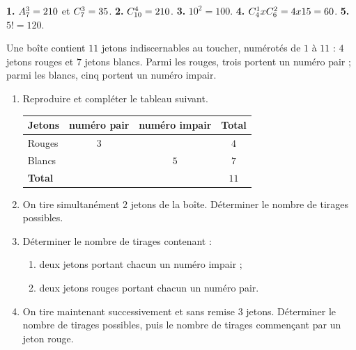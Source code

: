 \begin{corrige}[je me teste]
\textbf{1.} $\arrang{3}{7} = 210$ et $\combi{3}{7} = 35$.
\textbf{2.} $\combi{4}{10} = 210$.
\textbf{3.} $10^{2} = 100$.
\textbf{4.} $\combi{1}{4}\times\combi{2}{6} = 4\times15 = 60$.
\textbf{5.} $5! = 120$.
\end{corrige}

\begin{commeaubac}
Une boîte contient $11$ jetons indiscernables au toucher, numérotés de $1$
à $11$ : $4$ jetons rouges et $7$ jetons blancs. Parmi les rouges, trois
portent un numéro pair ; parmi les blancs, cinq portent un numéro impair.

\begin{enumerate}[label=\textbf{\arabic*.}, leftmargin=*, itemsep=0.25em]
  \item Reproduire et compléter le tableau suivant. \bareme{1 pt}
    \begin{center}\footnotesize
    \renewcommand{\arraystretch}{1.3}
    \begin{tabular}{|l|c|c|c|}
    \hline
    \textbf{Jetons} & \textbf{numéro pair} & \textbf{numéro impair} &
    \textbf{Total}\\
    \hline
    Rouges & $3$ & & $4$\\
    Blancs & & $5$ & $7$\\
    \hline
    \textbf{Total} & & & $11$\\
    \hline
    \end{tabular}
    \end{center}
  \item On tire simultanément $2$ jetons de la boîte. Déterminer le nombre
        de tirages possibles. 
  \item Déterminer le nombre de tirages contenant :
    \begin{enumerate}[label=\textbf{\alph*)}, leftmargin=1.4em, itemsep=0.15em]
      \item deux jetons portant chacun un numéro impair ; \bareme{1 pt}
      \item deux jetons rouges portant chacun un numéro pair. \bareme{1 pt}
    \end{enumerate}
  \item On tire maintenant successivement et sans remise $3$ jetons.
        Déterminer le nombre de tirages possibles, puis le nombre de tirages
        commençant par un jeton rouge. 
\end{enumerate}
\end{commeaubac}


